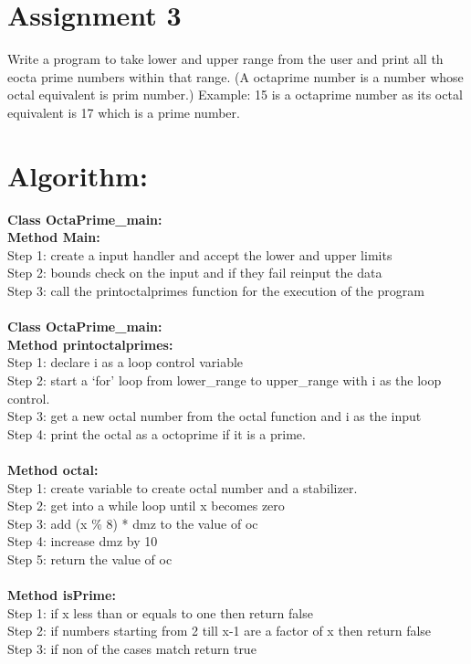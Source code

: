 \section*{\centering Assignment 3}
\vspace{15px}
Write a program to take lower and upper range from the user and print 
all th eocta prime numbers within that range. (A octaprime number is a number
whose octal equivalent is prim number.) Example: 15 is a octaprime number as its
octal equivalent is 17 which is a prime number.

\section*{Algorithm:}
\textbf{\color{javapurple}Class OctaPrime\_main:}\\
\textbf{Method Main:}\\
Step 1: create a input handler and accept the lower and upper limits\\
Step 2: bounds check on the input and if they fail reinput the data\\
Step 3: call the printoctalprimes function for the execution of the program\\\\
\textbf{\color{javapurple}Class OctaPrime\_main:}\\
\textbf{Method printoctalprimes:}\\
Step 1: declare i as a loop control variable \\
Step 2: start a `for' loop from lower\_range to upper\_range with i as the loop control.\\
Step 3: get a new octal number from the octal function and i as the input\\
Step 4: print the octal as a octoprime if it is a prime.\\\\
\textbf{Method octal:}\\
Step 1: create variable to create octal number and a stabilizer.\\
Step 2: get into a while loop until x becomes zero\\
Step 3: add (x \% 8) * dmz to the value of oc\\
Step 4: increase dmz by 10\\
Step 5: return the value of oc\\\\
\textbf{Method isPrime:}\\
Step 1: if x less than or equals to one then return false\\
Step 2: if numbers starting from 2 till x-1 are a factor of x then return false\\
Step 3: if non of the cases match return true\\\\


